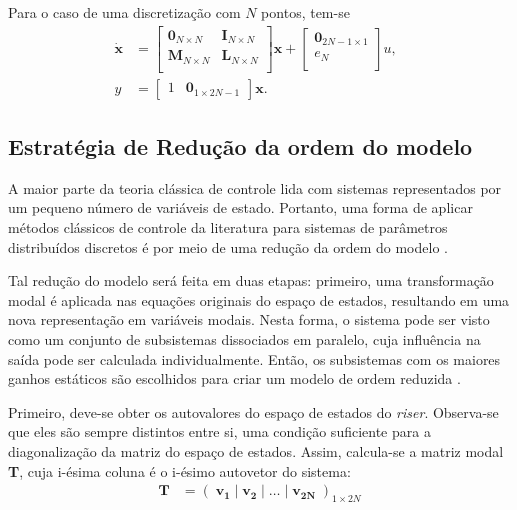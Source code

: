 Para o caso de uma discretização com $N$ pontos, tem-se \begin{align}
 	\mathbf{\dot{x}} &= \left[\begin{array}{cc}
	\mathbf{0}_{N\times N} & \mathbf{I}_{N\times N}\\
	\mathbf{M}_{N\times N} & \mathbf{L}_{N\times N}\\
\end{array}\right] \mathbf{x} + \left[\begin{array}{c}
	\mathbf{0}_{2N-1\times 1}\\ e_N\\
\end{array} \right]u,\;\;\\
y &= \left[\begin{array}{cc}
	1 & \textbf{0}_{1\times 2N-1}
\end{array}\right]\textbf{x}.
 \end{align}


\subsection{Estratégia de Redução da ordem do modelo\label{reducaoModal}}

 A maior parte da teoria clássica de controle lida com sistemas representados por um pequeno número de variáveis de estado. Portanto, uma forma de aplicar métodos clássicos de controle da literatura para sistemas de parâmetros distribuídos discretos é por meio de uma redução da ordem do modelo \cite{fabricioIFAC}.

 Tal redução do modelo será feita em duas etapas: primeiro, uma transformação modal é aplicada nas equações originais do espaço de estados, resultando em uma nova representação em variáveis modais. Nesta forma, o sistema pode ser visto como um conjunto de subsistemas dissociados em paralelo, cuja influência na saída pode ser calculada individualmente. Então, os subsistemas com os maiores ganhos estáticos são escolhidos para criar um modelo de ordem reduzida \cite{fabricioIFAC}.

 Primeiro, deve-se obter os autovalores do espaço de estados do \textit{riser}. Observa-se que eles são sempre distintos entre si, uma condição suficiente para a diagonalização da matriz do espaço de estados. Assim, calcula-se a matriz modal \textbf{T}, cuja i-ésima coluna é o i-ésimo autovetor do sistema: \begin{align}
	\mathbf{T} &= \left(\;\mathbf{v_1}\;|\;\mathbf{v_2}\;|\;\ldots\;|\;\mathbf{v_{2N}}\;\right)_{1\times 2N}
\end{align}

